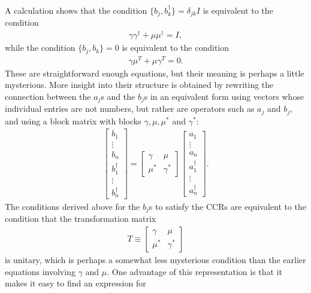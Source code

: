 \documentclass[12pt]{article}
\begin{document}
A calculation shows that the condition $\{ b_j, b_k^\dagger \} =
\delta_{jk} I$ is equivalent to the condition
\begin{eqnarray}
  \gamma \gamma^\dagger + \mu \mu^\dagger = I,
\end{eqnarray}
while the condition $\{ b_j, b_k \} = 0$ is equivalent to the condition
\begin{eqnarray}
  \gamma \mu^T+\mu \gamma^T = 0.
\end{eqnarray}
These are straightforward enough equations, but their meaning is
perhaps a little mysterious.  More insight into their structure is
obtained by rewriting the connection between the $a_j$s and the $b_j$s
in an equivalent form using vectors whose individual entries are not
numbers, but rather are operators such as $a_j$ and $b_j$, and using a
block matrix with blocks $\gamma, \mu, \mu^*$ and $\gamma^*$:
\begin{eqnarray}
  \left[ \begin{array}{c} b_1 \\ \vdots \\ b_n \\
    b_1^\dagger \\ \vdots \\ b_n^\dagger \end{array} \right]
  = \left[ \begin{array}{cc} \gamma & \mu \\ \mu^* & \gamma^*
      \end{array} \right] 
  \left[ \begin{array}{c} a_1 \\ \vdots \\ a_n \\
    a_1^\dagger \\ \vdots \\ a_n^\dagger \end{array} \right].
\end{eqnarray}
The conditions derived above for the $b_j$s to satisfy the CCRs are
equivalent to the condition that the transformation matrix
\begin{eqnarray}
  T \equiv \left[ \begin{array}{cc} \gamma & \mu \\ \mu^* & \gamma^*
      \end{array} \right]
\end{eqnarray}
is unitary, which is perhaps a somewhat less mysterious condition than
the earlier equations involving $\gamma$ and $\mu$.  One advantage of
this representation is that it makes it easy to find an expression for
\end{document}
